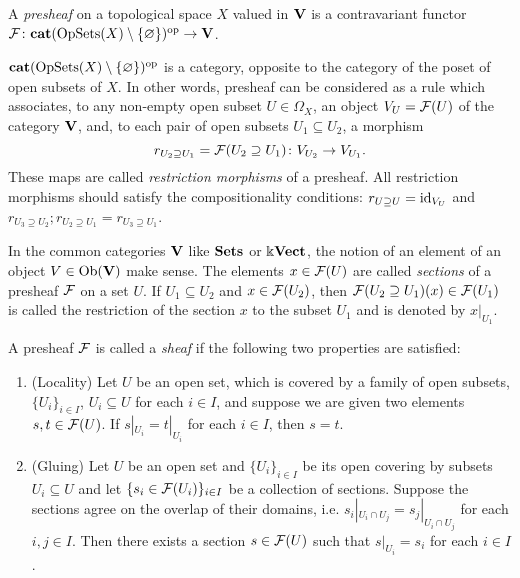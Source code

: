 \begin{defin}\label{definPresheaf}
A \emph{presheaf} on a topological space $X$ valued in $\mathbf{V}$ is a contravariant functor $\mathcal{F}\colon \mathbf{cat}(\operatorname{OpSets}(X)\setminus\{\varnothing\})^{\operatorname{op}}\to \mathbf{V}$.
\end{defin}

\begin{rem}\label{remPresheafInformally}
$\mathbf{cat}(\operatorname{OpSets}(X)\setminus\{\varnothing\})^{\operatorname{op}}$ is a category, opposite to the category of the poset of open subsets of $X$. In other words, presheaf can be considered as a rule which associates, to any non-empty open subset $U\in\Omega_X$, an object $V_U=\mathcal{F}(U)$ of the category $\mathbf{V}$, and, to each pair of open subsets $U_1\subseteq U_2$, a morphism
\[
r_{U_2\supseteq U_1}=\mathcal{F}(U_2\supseteq U_1)\colon V_{U_2}\to V_{U_1}.
\]
These maps are called \emph{restriction morphisms} of a presheaf. All restriction morphisms should satisfy the compositionality conditions: $r_{U\supseteq U}=\operatorname{id}_{V_U}$ and $r_{U_3\supseteq U_2};r_{U_2\supseteq U_1}=r_{U_3\supseteq U_1}$.
\end{rem}

\begin{rem}\label{remSectionOfPresheaf}
In the common categories $\mathbf{V}$ like $\mathbf{Sets}$ or $\Bbbk\mathbf{Vect}$, the notion of an element of an object $V\in\operatorname{Ob}(\mathbf{V})$ make sense. The elements $x\in\mathcal{F}(U)$ are called \emph{sections} of a presheaf $\mathcal{F}$ on a set $U$. If $U_1\subseteq U_2$ and $x\in\mathcal{F}(U_2)$, then $\mathcal{F}(U_2\supseteq U_1)(x)\in \mathcal{F}(U_1)$ is called the restriction of the section $x$ to the subset $U_1$ and is denoted by $x|_{U_1}$.
\end{rem}

\begin{defin}\label{definSheaf}
A presheaf $\mathcal{F}$ is called a \emph{sheaf} if the following two properties are satisfied:
\begin{enumerate}
  \item (Locality) Let $U$ be an open set, which is covered by a family of open subsets, $\{U_{i}\}_{i\in I}$, $U_{i}\subseteq U$ for each $i\in I$, and suppose we are given two elements $s,t\in \mathcal{F}(U)$. If $s|_{U_{i}}=t|_{U_{i}}$ for each $i\in I$, then $s=t$.
  \item (Gluing) Let $U$ be an open set and $\{U_{i}\}_{i\in I}$ be its open covering by subsets $U_{i}\subseteq U$ and let $\{s_{i}\in \mathcal{F}(U_{i})\}_{i\in I}$ be a collection of sections. Suppose the sections agree on the overlap of their domains, i.e. $s_{i}|_{U_{i}\cap U_{j}}=s_{j}|_{U_{i}\cap U_{j}}$ for each $i,j\in I$. Then there exists a section $s\in \mathcal{F}(U)$ such that $s|_{U_{i}}=s_{i}$ for each $i\in I$.
\end{enumerate}
\end{defin}

